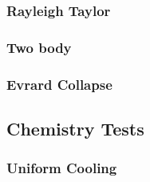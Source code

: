 \subsubsection{Rayleigh Taylor}
\subsubsection{Two body}
\subsubsection{Evrard Collapse}

\subsection{Chemistry Tests}
\subsubsection{Uniform Cooling}
